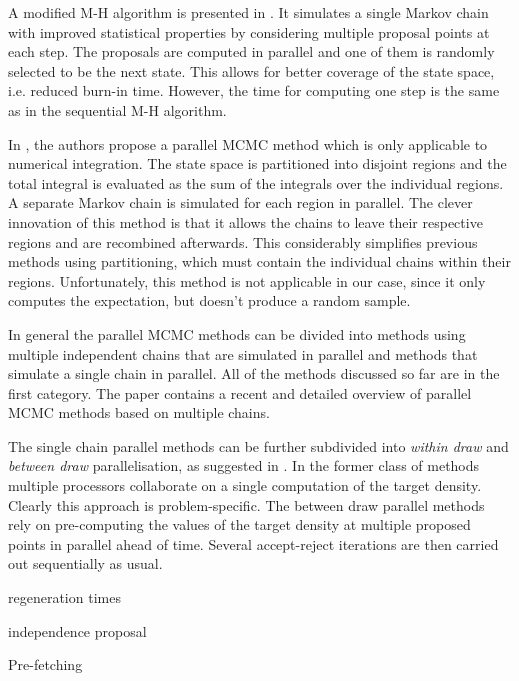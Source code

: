 \documentclass[11pt]{article}       %
\begin{document}
A modified M-H algorithm is presented in \cite{miller2010markov}.  It simulates
a single Markov chain with improved  statistical properties by considering
multiple proposal points at each step.  The proposals are computed in  parallel
and one of them is randomly selected to be the next state.  This allows for
better coverage of the state space, i.e. reduced burn-in time.  However, the
time for computing one step is the same as in the sequential 
M-H algorithm.


In \cite{vanderwerken2013parallel}, the authors propose a parallel MCMC method
which is only applicable to numerical integration.  The state space is
partitioned into disjoint regions and the total integral is evaluated as the
sum of the integrals over the individual regions. A separate Markov chain is
simulated for each region in parallel.  The clever innovation of this method is
that it allows the chains to leave their respective regions and are recombined
afterwards.  This considerably simplifies previous methods using partitioning,
which must contain the individual chains within their regions.  Unfortunately,
this method is not applicable in our case, since it only computes the
expectation, but doesn't produce a random sample.

In general the parallel MCMC methods can be divided into methods using multiple
independent chains that are simulated in parallel and methods that simulate a
single chain in parallel.  All of the methods discussed so far are in the first
category.  The paper \cite{guo2012parallel} contains a recent and detailed
overview of parallel MCMC methods based on multiple chains.

The single chain parallel methods can be further subdivided into \emph{within
draw} and \emph{between draw} parallelisation, as suggested in
\cite{strid2010efficient}.  In the former class of methods multiple processors
collaborate on a single computation of the target density.  Clearly this
approach is problem-specific.  The between draw parallel methods rely on
pre-computing the values of the target density at multiple proposed points  in
parallel ahead of time.  Several accept-reject iterations are then carried out
sequentially as usual.  

regeneration times

independence proposal

Pre-fetching

\cite{byrd2008reducing}








\end{document}
